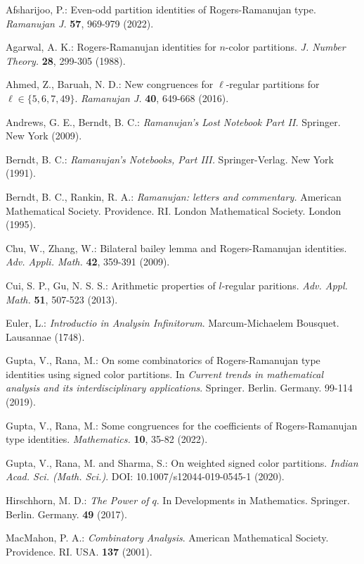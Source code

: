 \documentclass[12pt]{article}
\renewcommand{\(}{\left\(}
\renewcommand{\)}{\right\)}
\renewcommand{\[}{\left[}
\renewcommand{\]}{\right]}
\numberwithin{equation}{section}
\theoremstyle{plain}
\begin{document}
	\begin{thebibliography}{100}
	 Afsharijoo, P.: Even-odd partition identities of Rogers-Ramanujan type. \textit{Ramanujan J.} \textbf{57}, 969-979 (2022).
	
	 Agarwal, A. K.: Rogers-Ramanujan identities for $n$-color partitions. \textit{J. Number Theory.} \textbf{28}, 299-305 (1988).
	
	 Ahmed, Z., Baruah, N. D.: New congruences for $\ell$-regular partitions for $\ell\in\{5,6,7,49\}$. \textit{Ramanujan J.} \textbf{40}, 649-668 (2016).
	
	 Andrews, G. E., Berndt, B. C.: \textit{Ramanujan's Lost Notebook Part II.} Springer. New York (2009).
	
	 Berndt, B. C.:  \textit{Ramanujan's Notebooks, Part III.} Springer-Verlag. New York (1991).
	
	 Berndt, B. C., Rankin, R. A.: \textit{Ramanujan: letters and commentary.} American Mathematical Society. Providence. RI. London Mathematical Society. London (1995).
	
	 Chu, W., Zhang, W.: Bilateral bailey lemma and Rogers-Ramanujan identities. \textit{Adv. Appli. Math.}  \textbf{42}, 359-391 (2009).
	
	 Cui, S. P., Gu, N. S. S.: Arithmetic properties of $l$-regular paritions. \textit{Adv. Appl. Math.} \textbf{51}, 507-523 (2013).
	
	 Euler, L.: \textit{Introductio in Analysin Infinitorum}. Marcum-Michaelem Bousquet. Lausannae (1748).
	
	 Gupta, V., Rana, M.: On some combinatorics of Rogers-Ramanujan type identities using signed color partitions. In \textit{Current trends in mathematical analysis and its interdisciplinary applications}. Springer. Berlin. Germany.  99-114 (2019).
	
	 Gupta, V., Rana, M.:  Some congruences for the coefficients of Rogers-Ramanujan type identities. \textit{Mathematics.} \textbf{10}, 35-82 (2022).
	
	 Gupta, V., Rana, M. and Sharma, S.: On weighted signed color partitions. \textit{Indian Acad. Sci. (Math. Sci.)}. DOI: 10.1007/s12044-019-0545-1 (2020).
	
	 Hirschhorn, M. D.: \textit{The Power of $q$}. In Developments in Mathematics. Springer. Berlin. Germany. \textbf{49} (2017).
	
	 MacMahon, P. A.:\textit{ Combinatory Analysis}. American Mathematical Society. Providence. RI. USA. \textbf{137} (2001).
	

\end{thebibliography}
\end{document}

